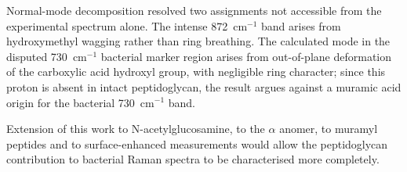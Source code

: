 \documentclass[preprint,12pt]{elsarticle}
\newcommand{\wn}{\ensuremath{\mathrm{cm}^{-1}}}
\begin{document}
Normal-mode decomposition resolved two assignments not accessible from the
experimental spectrum alone. The intense 872~\wn{} band arises from
hydroxymethyl wagging rather than ring breathing. The calculated mode in the
disputed 730~\wn{} bacterial marker region arises from out-of-plane deformation
of the carboxylic acid hydroxyl group, with negligible ring character; since
this proton is absent in intact peptidoglycan, the result argues against a
muramic acid origin for the bacterial 730~\wn{} band.

Extension of this work to N-acetylglucosamine, to the $\alpha$ anomer, to
muramyl peptides and to surface-enhanced measurements would allow the
peptidoglycan contribution to bacterial Raman spectra to be characterised more
completely.

\end{document}
